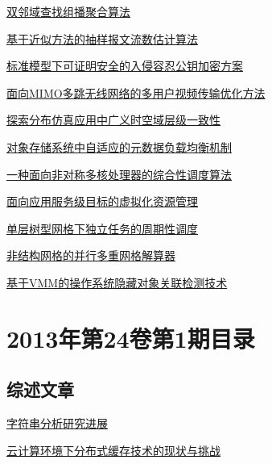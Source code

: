 \documentclass[a4paper]{article}
\begin{document}
\href{http://www.jos.org.cn/ch/reader/download_pdf.aspx?file_no=4247&year_id=2013&quarter_id=2&falg=1}{双邻域查找组播聚合算法}

\href{http://www.jos.org.cn/ch/reader/download_pdf.aspx?file_no=4316&year_id=2013&quarter_id=2&falg=1}{基于近似方法的抽样报文流数估计算法}

\href{http://www.jos.org.cn/ch/reader/download_pdf.aspx?file_no=4324&year_id=2013&quarter_id=2&falg=1}{标准模型下可证明安全的入侵容忍公钥加密方案}

\href{http://www.jos.org.cn/ch/reader/download_pdf.aspx?file_no=4201&year_id=2013&quarter_id=2&falg=1}{面向MIMO多跳无线网络的多用户视频传输优化方法}

\href{http://www.jos.org.cn/ch/reader/download_pdf.aspx?file_no=4328&year_id=2013&quarter_id=2&falg=1}{探索分布仿真应用中广义时空域层级一致性}

\href{http://www.jos.org.cn/ch/reader/download_pdf.aspx?file_no=4177&year_id=2013&quarter_id=2&falg=1}{对象存储系统中自适应的元数据负载均衡机制}

\href{http://www.jos.org.cn/ch/reader/download_pdf.aspx?file_no=4190&year_id=2013&quarter_id=2&falg=1}{一种面向非对称多核处理器的综合性调度算法}

\href{http://www.jos.org.cn/ch/reader/download_pdf.aspx?file_no=4216&year_id=2013&quarter_id=2&falg=1}{面向应用服务级目标的虚拟化资源管理}

\href{http://www.jos.org.cn/ch/reader/download_pdf.aspx?file_no=4224&year_id=2013&quarter_id=2&falg=1}{单层树型网格下独立任务的周期性调度}

\href{http://www.jos.org.cn/ch/reader/download_pdf.aspx?file_no=4241&year_id=2013&quarter_id=2&falg=1}{非结构网格的并行多重网格解算器}

\href{http://www.jos.org.cn/ch/reader/download_pdf.aspx?file_no=4265&year_id=2013&quarter_id=2&falg=1}{基于VMM的操作系统隐藏对象关联检测技术}


\section{\textbf{2013年第24卷第1期目录}}
\subsection{综述文章}
\href{http://www.jos.org.cn/ch/reader/download_pdf.aspx?file_no=4334&year_id=2013&quarter_id=1&falg=1}{字符串分析研究进展}

\href{http://www.jos.org.cn/ch/reader/download_pdf.aspx?file_no=4276&year_id=2013&quarter_id=1&falg=1}{云计算环境下分布式缓存技术的现状与挑战}
\end{document}

